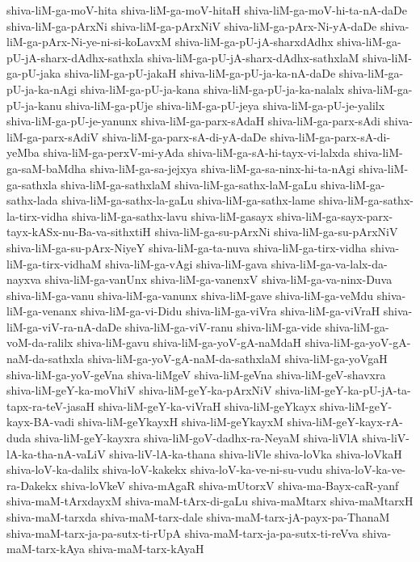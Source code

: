 {shiva-liM-ga-moV-hita
shiva-liM-ga-moV-hitaH
shiva-liM-ga-moV-hi-ta-nA-daDe
shiva-liM-ga-pArxNi
shiva-liM-ga-pArxNiV
shiva-liM-ga-pArx-Ni-yA-daDe
shiva-liM-ga-pArx-Ni-ye-ni-si-koLavxM
shiva-liM-ga-pU-jA-sharxdAdhx
shiva-liM-ga-pU-jA-sharx-dAdhx-sathxla
shiva-liM-ga-pU-jA-sharx-dAdhx-sathxlaM
shiva-liM-ga-pU-jaka
shiva-liM-ga-pU-jakaH
shiva-liM-ga-pU-ja-ka-nA-daDe
shiva-liM-ga-pU-ja-ka-nAgi
shiva-liM-ga-pU-ja-kana
shiva-liM-ga-pU-ja-ka-nalalx
shiva-liM-ga-pU-ja-kanu
shiva-liM-ga-pUje
shiva-liM-ga-pU-jeya
shiva-liM-ga-pU-je-yalilx
shiva-liM-ga-pU-je-yanunx
shiva-liM-ga-parx-sAdaH
shiva-liM-ga-parx-sAdi
shiva-liM-ga-parx-sAdiV
shiva-liM-ga-parx-sA-di-yA-daDe
shiva-liM-ga-parx-sA-di-yeMba
shiva-liM-ga-perxV-mi-yAda
shiva-liM-ga-sA-hi-tayx-vi-lalxda
shiva-liM-ga-saM-baMdha
shiva-liM-ga-sa-jejxya
shiva-liM-ga-sa-ninx-hi-ta-nAgi
shiva-liM-ga-sathxla
shiva-liM-ga-sathxlaM
shiva-liM-ga-sathx-laM-gaLu
shiva-liM-ga-sathx-lada
shiva-liM-ga-sathx-la-gaLu
shiva-liM-ga-sathx-lame
shiva-liM-ga-sathx-la-tirx-vidha
shiva-liM-ga-sathx-lavu
shiva-liM-gasayx
shiva-liM-ga-sayx-parx-tayx-kASx-nu-Ba-va-sithxtiH
shiva-liM-ga-su-pArxNi
shiva-liM-ga-su-pArxNiV
shiva-liM-ga-su-pArx-NiyeY
shiva-liM-ga-ta-nuva
shiva-liM-ga-tirx-vidha
shiva-liM-ga-tirx-vidhaM
shiva-liM-ga-vAgi
shiva-liM-gava
shiva-liM-ga-va-lalx-da-nayxva
shiva-liM-ga-vanUnx
shiva-liM-ga-vanenxV
shiva-liM-ga-va-ninx-Duva
shiva-liM-ga-vanu
shiva-liM-ga-vanunx
shiva-liM-gave
shiva-liM-ga-veMdu
shiva-liM-ga-venanx
shiva-liM-ga-vi-Didu
shiva-liM-ga-viVra
shiva-liM-ga-viVraH
shiva-liM-ga-viV-ra-nA-daDe
shiva-liM-ga-viV-ranu
shiva-liM-ga-vide
shiva-liM-ga-voM-da-ralilx
shiva-liM-gavu
shiva-liM-ga-yoV-gA-naMdaH
shiva-liM-ga-yoV-gA-naM-da-sathxla
shiva-liM-ga-yoV-gA-naM-da-sathxlaM
shiva-liM-ga-yoVgaH
shiva-liM-ga-yoV-geVna
shiva-liMgeV
shiva-liM-geVna
shiva-liM-geV-shavxra
shiva-liM-geY-ka-moVhiV
shiva-liM-geY-ka-pArxNiV
shiva-liM-geY-ka-pU-jA-ta-tapx-ra-teV-jasaH
shiva-liM-geY-ka-viVraH
shiva-liM-geYkayx
shiva-liM-geY-kayx-BA-vadi
shiva-liM-geYkayxH
shiva-liM-geYkayxM
shiva-liM-geY-kayx-rA-duda
shiva-liM-geY-kayxra
shiva-liM-goV-dadhx-ra-NeyaM
shiva-liVlA
shiva-liV-lA-ka-tha-nA-vaLiV
shiva-liV-lA-ka-thana
shiva-liVle
shiva-loVka
shiva-loVkaH
shiva-loV-ka-dalilx
shiva-loV-kakekx
shiva-loV-ka-ve-ni-su-vudu
shiva-loV-ka-ve-ra-Dakekx
shiva-loVkeV
shiva-mAgaR
shiva-mUtorxV
shiva-ma-Bayx-caR-yanf
shiva-maM-tArxdayxM
shiva-maM-tArx-di-gaLu
shiva-maMtarx
shiva-maMtarxH
shiva-maM-tarxda
shiva-maM-tarx-dale
shiva-maM-tarx-jA-payx-pa-ThanaM
shiva-maM-tarx-ja-pa-sutx-ti-rUpA
shiva-maM-tarx-ja-pa-sutx-ti-reVva
shiva-maM-tarx-kAya
shiva-maM-tarx-kAyaH
}
